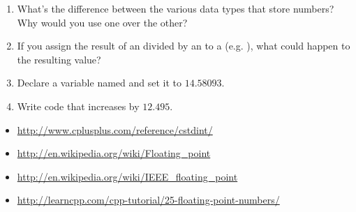 \begin{enumerate}
	\item What's the difference between the various data types that store numbers? Why would you use one over the other?

	\item If you assign the result of an  divided by an  to a  (e.g. ), what could happen to the resulting value?

  \item Declare a variable named  and set it to $14.58093$.

 	\item Write code that increases  by $12.495$. 

\end{enumerate}




\begin{itemize}
\item \url{http://www.cplusplus.com/reference/cstdint/}
\item \url{http://en.wikipedia.org/wiki/Floating_point}
\item \url{http://en.wikipedia.org/wiki/IEEE_floating_point}
\item \url{http://learncpp.com/cpp-tutorial/25-floating-point-numbers/}
\end{itemize}	

